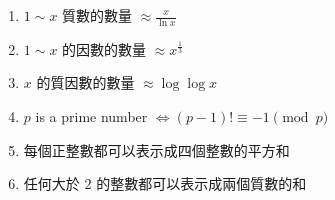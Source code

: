 \begin{enumerate}
    \item $1 \sim x$ 質數的數量 $\approx \frac{x}{\ln x}$
    \item $1 \sim x$ 的因數的數量 $\approx x^\frac{1}{3}$
    \item $x$ 的質因數的數量 $\approx \log{\log{x}}$
    \item $p$ is a prime number $\Leftrightarrow (p-1)! \equiv -1  \pmod{p}$
    \item 每個正整數都可以表示成四個整數的平方和
    \item 任何大於 $2$ 的整數都可以表示成兩個質數的和
\end{enumerate}
